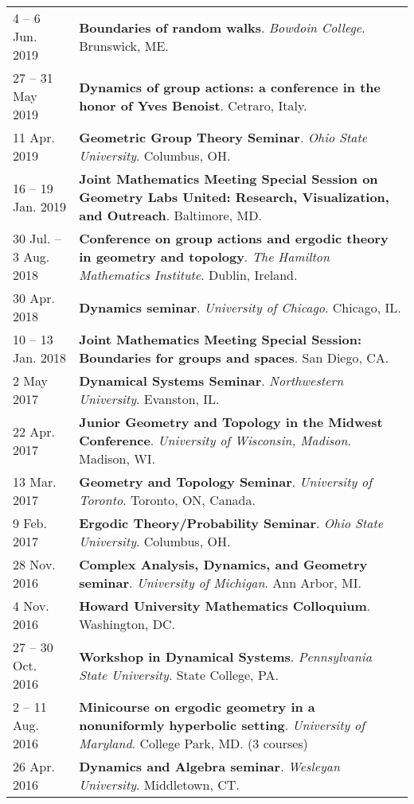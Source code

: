 \begin{center}
{\begin{longtable}{p{}  p{}}
4  -- 6 Jun.  2019 & \textbf{Boundaries of random walks}. \textit{Bowdoin College}.  Brunswick, ME.  \\ 
27  -- 31 May  2019 & \textbf{Dynamics of group actions: a conference in the honor of Yves Benoist}.  Cetraro, Italy.  \\ 
11 Apr.  2019 & \textbf{Geometric Group Theory Seminar}. \textit{Ohio State University}.  Columbus, OH.  \\ 
16  -- 19 Jan.  2019 & \textbf{Joint Mathematics Meeting Special Session on Geometry Labs United: Research, Visualization, and Outreach}.  Baltimore, MD.  \\ 
30 Jul.  -- 3 Aug.  2018 & \textbf{Conference on group actions and ergodic theory in geometry and topology}. \textit{The Hamilton Mathematics Institute}.  Dublin, Ireland.  \\ 
30 Apr.  2018 & \textbf{Dynamics seminar}. \textit{University of Chicago}.  Chicago, IL.  \\ 
10  -- 13 Jan.  2018 & \textbf{Joint Mathematics Meeting Special Session: Boundaries for groups and spaces}.  San Diego, CA.  \\ 
2 May  2017 & \textbf{Dynamical Systems Seminar}. \textit{Northwestern University}.  Evanston, IL.  \\ 
22 Apr.  2017 & \textbf{Junior Geometry and Topology in the Midwest Conference}. \textit{University of Wisconsin, Madison}.  Madison, WI.  \\ 
13 Mar.  2017 & \textbf{Geometry and Topology Seminar}. \textit{University of Toronto}.  Toronto, ON, Canada.  \\ 
9 Feb.  2017 & \textbf{Ergodic Theory/Probability Seminar}. \textit{Ohio State University}.  Columbus, OH.  \\ 
28 Nov.  2016 & \textbf{Complex Analysis, Dynamics, and Geometry seminar}. \textit{University of Michigan}.  Ann Arbor, MI.  \\ 
4 Nov.  2016 & \textbf{Howard University Mathematics Colloquium}.  Washington, DC.  \\ 
27  -- 30 Oct.  2016 & \textbf{Workshop in Dynamical Systems}. \textit{Pennsylvania State University}.  State College, PA.  \\ 
2  -- 11 Aug.  2016 & \textbf{Minicourse on ergodic geometry in a nonuniformly hyperbolic setting}. \textit{University of Maryland}.  College Park, MD. (3 courses) \\ 
26 Apr.  2016 & \textbf{Dynamics and Algebra seminar}. \textit{Wesleyan University}.  Middletown, CT.  \\ 

\end{longtable}}
\end{center}
